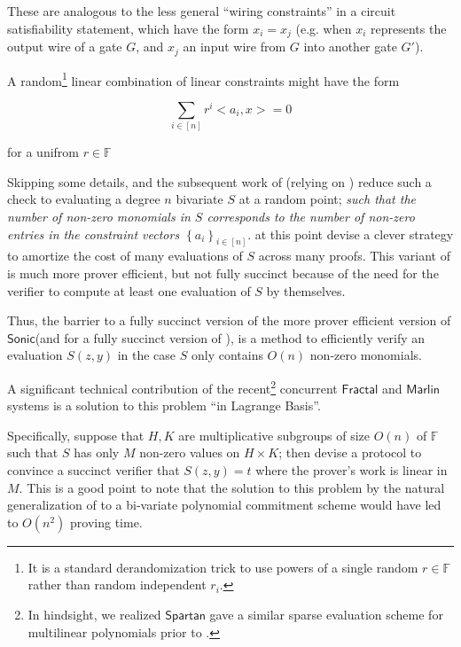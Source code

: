 \documentclass[11pt]{article} %
\newcommand{\F}{\ensuremath{\mathbb F}\xspace}
\newcommand{\sett}[2]{\ensuremath{\set{#1}_{#2}}\xspace}
\newcommand{\sonic}{\ensuremath{\mathsf{Sonic}}\xspace}
\newcommand{\set}[1]{\ensuremath{\left\{#1\right\}}\xspace}
\newcommand{\marlin}{\ensuremath{\mathsf{Marlin}}\xspace}
\newcommand{\spartan}{\ensuremath{\mathsf{Spartan}}}
\newcommand{\fractal}{\ensuremath{\mathsf{Fractal}}\xspace}
\begin{document}
These are analogous to the less general ``wiring constraints'' in a circuit satisfiability statement, which
have the form $x_i=x_j$ (e.g. when $x_i$ represents the output wire of a gate $G$, and $x_j$ an input wire from $G$ into another gate $G'$).



A random\footnote{It is a standard derandomization trick to use powers of a single random $r\in \F$ rather than random independent $r_i$.} linear combination of linear constraints might have the form

\[\sum_{i\in [n]} r^i <a_i,x>=0 \]

for a unifrom $r\in \F$

Skipping some details, \cite{sonic} and the subsequent work of \cite{auroralight} (relying on \cite{aurora}) reduce such a check to evaluating a degree $n$ bivariate $S$ at a random point; \emph{such that the number of non-zero monomials in $S$ corresponds to the number of non-zero entries in the constraint vectors \sett{a_i}{i\in [n]}}.
\cite{sonic} at this point devise a clever strategy to amortize the cost of many evaluations of $S$ across many proofs.
This variant of \cite{sonic} is much more prover efficient, but not fully succinct because of the need for the verifier to compute at least one evaluation of $S$ by themselves.


Thus, the barrier to a fully succinct version of the more prover efficient version of \sonic (and for a fully succinct version of \cite{
auroralight}), is a method to efficiently verify an evaluation $S(z,y)$ in the case $S$ only contains $O(n)$ non-zero monomials.

A significant technical contribution of the recent\footnote{In hindsight, we realized \spartan\cite{spartan} gave a similar sparse evaluation scheme for multilinear polynomials prior to \cite{marlin,fractal}.}  concurrent \fractal and \marlin systems \cite{marlin,fractal}
is a solution to this problem ``in Lagrange Basis''.

Specifically, suppose that $H,K$ are multiplicative subgroups of size $O(n)$ of \F such that $S$ has only $M$ non-zero values on $H\times K$; then \cite{marlin,fractal} devise a protocol to convince a succinct verifier that $S(z,y)=t$ where the prover's work is linear in $M$. This is a good point to note that the solution to this problem by the natural generalization of \cite{kate} to a bi-variate polynomial commitment scheme would have led to $O(n^2)$ proving time.
\end{document}

